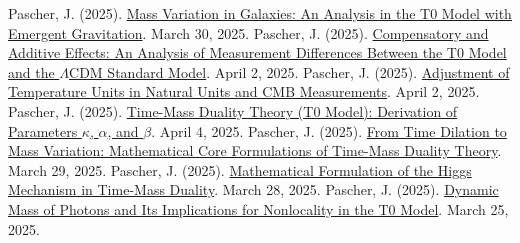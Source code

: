 \documentclass[a4paper,12pt]{article}
\theoremstyle{definition}
\theoremstyle{remark}
\begin{document}
	\begin{thebibliography}{99}
		 Pascher, J. (2025). \href{https://github.com/jpascher/T0-Time-Mass-Duality/tree/main/2/pdf/English/MassVarGalaxienEn.pdf}{Mass Variation in Galaxies: An Analysis in the T0 Model with Emergent Gravitation}. March 30, 2025.
		 Pascher, J. (2025). \href{https://github.com/jpascher/T0-Time-Mass-Duality/tree/main/2/pdf/English/MessdifferenzenT0StandardEn.pdf}{Compensatory and Additive Effects: An Analysis of Measurement Differences Between the T0 Model and the \(\Lambda\)CDM Standard Model}. April 2, 2025.
		 Pascher, J. (2025). \href{https://github.com/jpascher/T0-Time-Mass-Duality/tree/main/2/pdf/English/NatEinheitenAlpha1En.pdf}{Adjustment of Temperature Units in Natural Units and CMB Measurements}. April 2, 2025.
		 Pascher, J. (2025). \href{https://github.com/jpascher/T0-Time-Mass-Duality/tree/main/2/pdf/English/ZeitMasseT0ParamsEn.pdf}{Time-Mass Duality Theory (T0 Model): Derivation of Parameters \(\kappa\), \(\alpha\), and \(\beta\)}. April 4, 2025.
		 Pascher, J. (2025). \href{https://github.com/jpascher/T0-Time-Mass-Duality/tree/main/2/pdf/English/MathZeitMasseLagrange.pdf}{From Time Dilation to Mass Variation: Mathematical Core Formulations of Time-Mass Duality Theory}. March 29, 2025.
		 Pascher, J. (2025). \href{https://github.com/jpascher/T0-Time-Mass-Duality/tree/main/2/pdf/English/MathHiggsZeitMasseEn.pdf}{Mathematical Formulation of the Higgs Mechanism in Time-Mass Duality}. March 28, 2025.
		 Pascher, J. (2025). \href{https://github.com/jpascher/T0-Time-Mass-Duality/tree/main/2/pdf/English/DynMassePhotonenNichtlokalEn.pdf}{Dynamic Mass of Photons and Its Implications for Nonlocality in the T0 Model}. March 25, 2025.
	\end{thebibliography}
	
\end{document}
